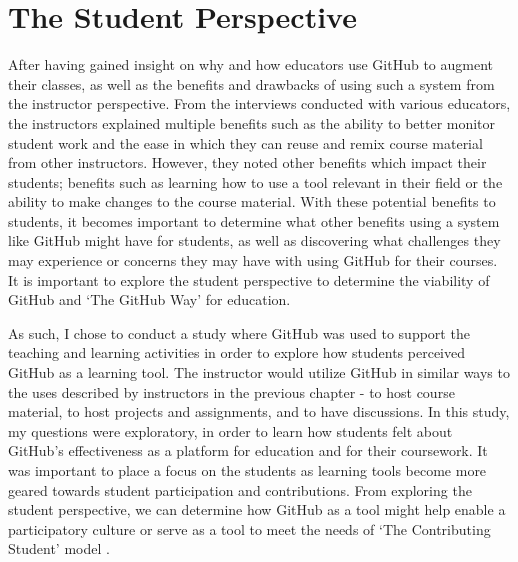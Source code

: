 








\chapter{The Student Perspective}

After having gained insight on why and how educators use GitHub to augment their classes, as well as the benefits and drawbacks of using such a system from the instructor perspective. From the interviews conducted with various educators, the instructors explained multiple benefits such as the ability to better monitor student work and the ease in which they can reuse and remix course material from other instructors. However, they noted other benefits which impact their students; benefits such as learning how to use a tool relevant in their field or the ability to make changes to the course material. With these potential benefits to students, it becomes important to determine what other benefits using a system like GitHub might have for students, as well as discovering what challenges they may experience or concerns they may have with using GitHub for their courses. It is important to explore the student perspective to determine the viability of GitHub and `The GitHub Way' for education.

As such, I chose to conduct a study where GitHub was used to support the teaching and learning activities in order to explore how students perceived GitHub as a learning tool. The instructor would utilize GitHub in similar ways to the uses described by instructors in the previous chapter - to host course material, to host projects and assignments, and to have discussions. In this study, my questions were exploratory, in order to learn how students felt about GitHub's effectiveness as a platform for education and for their coursework. It was important to place a focus on the students as learning tools become more geared towards student participation and contributions. From exploring the student perspective, we can determine how GitHub as a tool might help enable a participatory culture \cite{jenkins2009confronting} or serve as a tool to meet the needs of `The Contributing Student' model \cite{hamer2008contributing}.

